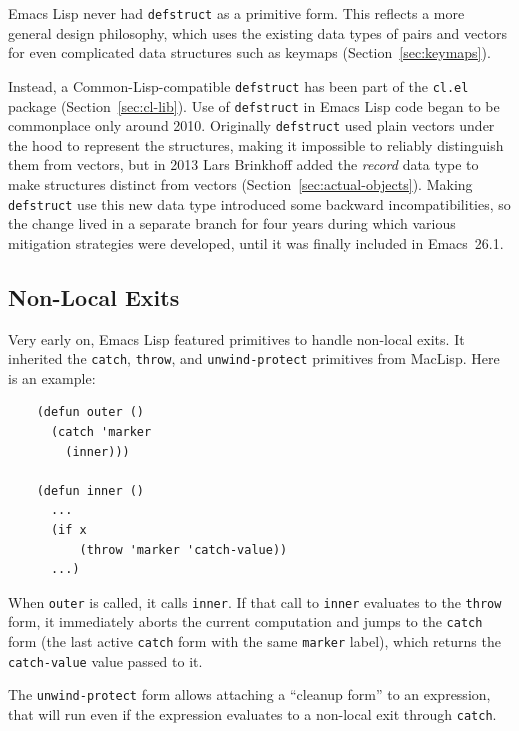 \documentclass[format=acmsmall,screen]{acmart}
\newcommand \Elisp {Emacs Lisp}
\begin{document}
\Elisp{} never had \texttt{defstruct} as a primitive form.  This
reflects a more general design philosophy, which uses the existing
data types of pairs and vectors for even complicated data structures
such as keymaps (Section~\ref{sec:keymaps}).

Instead, a Common-Lisp-compatible \texttt{defstruct} has been part of the
\texttt{cl.el} package (Section~\ref{sec:cl-lib}).  Use of
\texttt{defstruct} in \Elisp{} code began to be commonplace only around
2010.  Originally \texttt{defstruct} used plain vectors under the hood to represent the
structures, making it impossible to reliably distinguish them from vectors,
but in 2013 Lars Brinkhoff added the \emph{record} data type to make
structures distinct from vectors
(Section~\ref{sec:actual-objects}).  Making \texttt{defstruct} use this new
data type introduced some backward incompatibilities, so the change lived in
a separate branch for four years during which various mitigation strategies
were developed, until it was finally included in Emacs~26.1.

\subsection{Non-Local Exits}
\label{sec:non-local-exits}

Very early on, \Elisp{} featured primitives to handle
non-local exits.  It inherited the \texttt{catch}, \texttt{throw}, and
\texttt{unwind-protect} primitives from MacLisp.  Here is an example:
%
\begin{verbatim}
    (defun outer ()
      (catch 'marker
        (inner)))
    
    (defun inner ()
      ...
      (if x
          (throw 'marker 'catch-value))
      ...)
\end{verbatim}
%
When \texttt{outer} is called, it calls \texttt{inner}.  If that call
to \texttt{inner} evaluates to the \texttt{throw} form, it immediately
aborts the current computation and jumps to the \texttt{catch} form
(the last active \texttt{catch} form with the same \texttt{marker}
label), which returns the \texttt{catch-value} value passed to it.

The \texttt{unwind-protect} form allows attaching a ``cleanup form''
to an expression, that will run even if the expression evaluates to a
non-local exit through \texttt{catch}.
\end{document}

